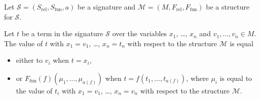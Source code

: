 \begin{definition}
  Let $\mathcal{S} = (S_\mathrm{rel}, S_\mathrm{fun}, a)$ be a signature and
  $\mathcal{M} = (M, F_\mathrm{rel}, F_\mathrm{fun})$ be a structure for
  $\mathcal{S}$.

  Let $t$ be a term in the signature $\mathcal{S}$ over the variables
  $x_1$, \dots, $x_n$ and $v_1, \dots, v_n \in M$.
  The value of $t$ with $x_1 = v_1$, \dots, $x_n = t_n$ with respect to the
  structure $\mathcal{M}$ is equal
  \begin{itemize}
    \item either to $v_i$ when $t = x_i$,
    \item or $F_\mathrm{fun}(f)(\mu_1, \dots, \mu_{a(f)})$ when
      $t = f(t_1, \dots, t_{a(f)})$, where $\mu_i$ is equal to the value of
      $t_i$ with $x_1 = v_1$, \dots, $x_n = v_n$ with respect to the
      structure $\mathcal{M}$.
  \end{itemize}


\end{definition}
